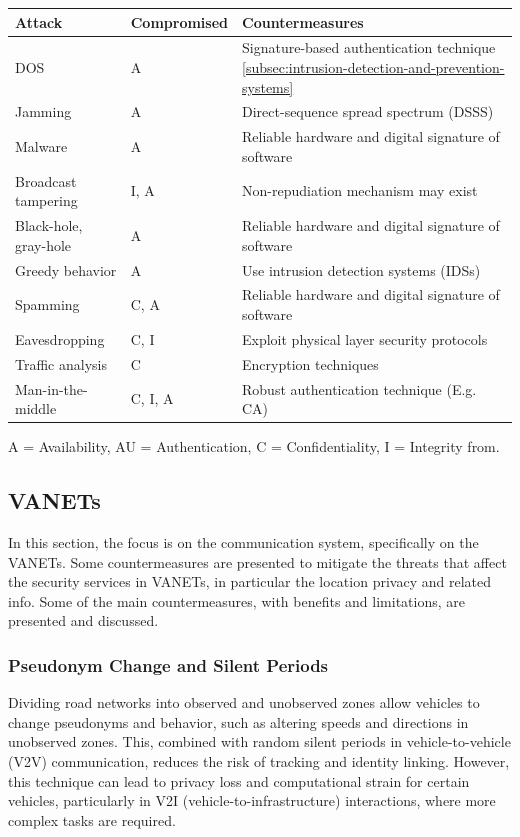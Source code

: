 \begin{table}[h]
    \centering
    \begin{tabular}{|l|l|l|}
        \hline
        \textbf{Attack} & \textbf{Compromised} & \textbf{Countermeasures} \\ \hline
        DOS & A & Signature-based authentication technique \ref{subsec:intrusion-detection-and-prevention-systems} \\ \hline
        Jamming & A & Direct-sequence spread spectrum (DSSS\cite{wang2022when}) \\ \hline
        Malware & A & Reliable hardware and digital signature of software \\ \hline
        Broadcast tampering & I, A & Non-repudiation mechanism may exist \\ \hline
        Black-hole, gray-hole & A & Reliable hardware and digital signature of software \\ \hline
        Greedy behavior & A & Use intrusion detection systems (IDSs) \\ \hline
        Spamming & C, A & Reliable hardware and digital signature of software \\ \hline
        Eavesdropping & C, I & Exploit physical layer security protocols \\ \hline
        Traffic analysis & C & Encryption techniques \\ \hline
        Man-in-the-middle & C, I, A & Robust authentication technique (E.g. CA) \\ \hline
    \end{tabular}
    \label{tab:Summary of Attacks and Countermeasures}
\end{table}
A = Availability, AU = Authentication, C = Confidentiality, I = Integrity
from\cite{sheikh2019comprehensive}.

\subsection{VANETs}\label{subsec:v2x-communication-and-network}

In this section, the focus is on the communication system, specifically on the VANETs.
Some countermeasures are presented to mitigate the threats that affect the security services in VANETs, in particular the location privacy and related info.
Some of the main countermeasures, with benefits and limitations, are presented and discussed.

\subsubsection{Pseudonym Change and Silent Periods}
Dividing road networks into observed and unobserved zones allow vehicles to change pseudonyms and behavior, such as altering speeds and directions in unobserved zones.
This, combined with random silent periods in vehicle-to-vehicle (V2V) communication, reduces the risk of tracking and identity linking.
However, this technique can lead to privacy loss and computational strain for certain vehicles, particularly in V2I (vehicle-to-infrastructure) interactions, where more complex tasks are required.

